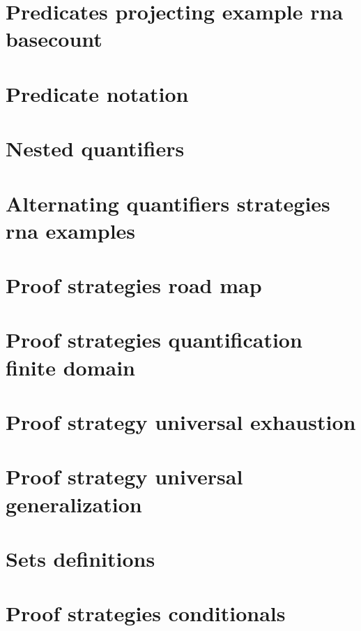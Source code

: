 \section*{Predicates projecting example rna basecount}

\vfill
\section*{Predicate notation}

\vfill
\section*{Nested quantifiers}

\vfill
\section*{Alternating quantifiers strategies rna examples}

\vfill
\section*{Proof strategies road map}

\vfill
\section*{Proof strategies quantification finite domain}

\vfill
\section*{Proof strategy universal exhaustion}

\vfill
\section*{Proof strategy universal generalization}

\vfill
\section*{Sets definitions}

\vfill
\section*{Proof strategies conditionals}

\vfill

